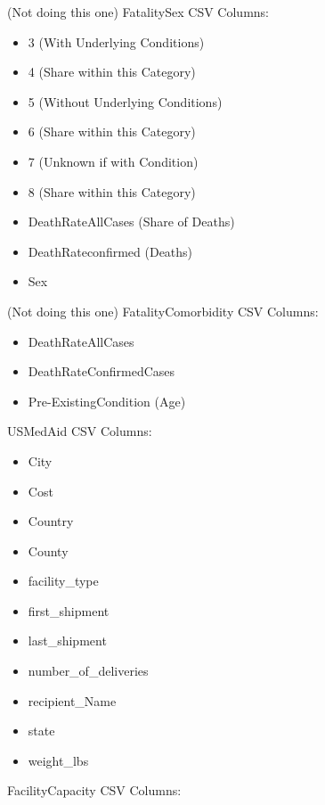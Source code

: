 \documentclass[11pt]{article}
\begin{document}
\noindent
(Not doing this one) FatalitySex CSV Columns:

\begin{itemize}
    \item 3 (With Underlying Conditions)
    \item 4 (Share within this Category)
    \item 5 (Without Underlying Conditions)
    \item 6 (Share within this Category)
    \item 7 (Unknown if with Condition)
    \item 8 (Share within this Category)
    \item DeathRateAllCases (Share of Deaths)
    \item DeathRateconfirmed (Deaths)
    \item Sex
\end{itemize}

\noindent
(Not doing this one) FatalityComorbidity CSV Columns:

\begin{itemize}
    \item DeathRateAllCases
    \item DeathRateConfirmedCases
    \item Pre-ExistingCondition (Age)
\end{itemize}

\noindent
USMedAid CSV Columns:

\begin{itemize}
    \item City
    \item Cost
    \item Country
    \item County
    \item facility\_type
    \item first\_shipment
    \item last\_shipment
    \item number\_of\_deliveries
    \item recipient\_Name
    \item state
    \item weight\_lbs
\end{itemize}

\noindent
FacilityCapacity CSV Columns:
\end{document}
